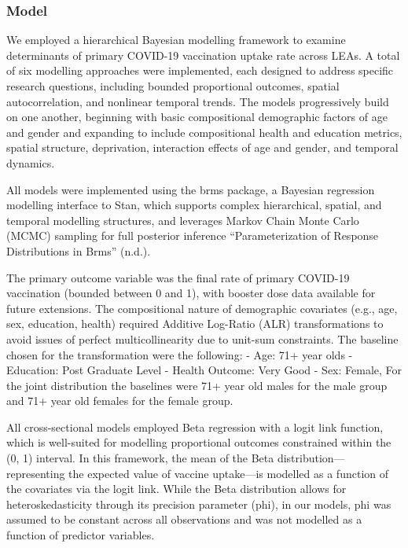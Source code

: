 \documentclass{article}
\begin{document}
\subsubsection{Model}\label{model}

We employed a hierarchical Bayesian modelling framework to examine
determinants of primary COVID-19 vaccination uptake rate across LEAs. A
total of six modelling approaches were implemented, each designed to
address specific research questions, including bounded proportional
outcomes, spatial autocorrelation, and nonlinear temporal trends. The
models progressively build on one another, beginning with basic
compositional demographic factors of age and gender and expanding to
include compositional health and education metrics, spatial structure,
deprivation, interaction effects of age and gender, and temporal
dynamics.

All models were implemented using the brms package, a Bayesian
regression modelling interface to Stan, which supports complex
hierarchical, spatial, and temporal modelling structures, and leverages
Markov Chain Monte Carlo (MCMC) sampling for full posterior inference
{``Parameterization of {Response} {Distributions} in Brms''} (n.d.).

The primary outcome variable was the final rate of primary COVID-19
vaccination (bounded between 0 and 1), with booster dose data available
for future extensions. The compositional nature of demographic
covariates (e.g., age, sex, education, health) required Additive
Log-Ratio (ALR) transformations to avoid issues of perfect
multicollinearity due to unit-sum constraints. The baseline chosen for
the transformation were the following: - Age: 71+ year olds - Education:
Post Graduate Level - Health Outcome: Very Good - Sex: Female, For the
joint distribution the baselines were 71+ year old males for the male
group and 71+ year old females for the female group.

All cross-sectional models employed Beta regression with a logit link
function, which is well-suited for modelling proportional outcomes
constrained within the (0, 1) interval. In this framework, the mean of
the Beta distribution---representing the expected value of vaccine
uptake---is modelled as a function of the covariates via the logit link.
While the Beta distribution allows for heteroskedasticity through its
precision parameter (phi), in our models, phi was assumed to be constant
across all observations and was not modelled as a function of predictor
variables.
\end{document}
